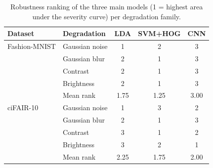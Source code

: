 \begin{table}[t]
\centering
\caption{Robustness ranking of the three main models (1 = highest area under the severity curve) per degradation family.}
\label{tab:rank}
\small
\begin{tabular}{llccc}
\toprule
Dataset & Degradation & LDA & SVM+HOG & CNN \\
\midrule
Fashion-MNIST & Gaussian noise & 1 & 2 & 3 \\
 & Gaussian blur & 2 & 1 & 3 \\
 & Contrast & 2 & 1 & 3 \\
 & Brightness & 2 & 1 & 3 \\
 & Mean rank & 1.75 & 1.25 & 3.00 \\
\midrule
ciFAIR-10 & Gaussian noise & 1 & 3 & 2 \\
 & Gaussian blur & 2 & 1 & 3 \\
 & Contrast & 3 & 1 & 2 \\
 & Brightness & 3 & 2 & 1 \\
 & Mean rank & 2.25 & 1.75 & 2.00 \\
\bottomrule
\end{tabular}
\end{table}
